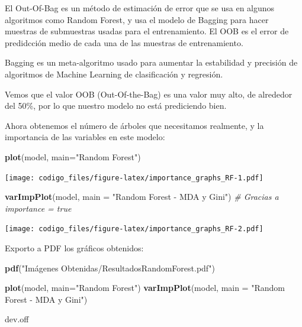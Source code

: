 \documentclass[]{article}
\newenvironment{Shaded}{\begin{snugshade}}{\end{snugshade}}
\newcommand{\KeywordTok}[1]{\textcolor[rgb]{0.13,0.29,0.53}{\textbf{#1}}}
\newcommand{\DataTypeTok}[1]{\textcolor[rgb]{0.13,0.29,0.53}{#1}}
\newcommand{\StringTok}[1]{\textcolor[rgb]{0.31,0.60,0.02}{#1}}
\newcommand{\CommentTok}[1]{\textcolor[rgb]{0.56,0.35,0.01}{\textit{#1}}}
\newcommand{\NormalTok}[1]{#1}
\begin{document}
El Out-Of-Bag es un método de estimación de error que se usa en algunos
algoritmos como Random Forest, y usa el modelo de Bagging para hacer
muestras de submuestras usadas para el entrenamiento. El OOB es el error
de predidcción medio de cada una de las muestras de entrenamiento.

Bagging es un meta-algoritmo usado para aumentar la estabilidad y
precisión de algoritmos de Machine Learning de clasificación y
regresión.

Vemos que el valor OOB (Out-Of-the-Bag) es una valor muy alto, de
alrededor del 50\%, por lo que nuestro modelo no está prediciendo bien.

Ahora obtenemos el número de árboles que necesitamos realmente, y la
importancia de las variables en este modelo:

\begin{Shaded}
\begin{Highlighting}[]
\KeywordTok{plot}\NormalTok{(model, }\DataTypeTok{main=}\StringTok{"Random Forest"}\NormalTok{)}
\end{Highlighting}
\end{Shaded}

\texttt{[image: codigo\_files/figure-latex/importance\_graphs\_RF-1.pdf]}

\begin{Shaded}
\begin{Highlighting}[]
\KeywordTok{varImpPlot}\NormalTok{(model, }\DataTypeTok{main =} \StringTok{"Random Forest - MDA y Gini"}\NormalTok{) }\CommentTok{# Gracias a importance = true}
\end{Highlighting}
\end{Shaded}

\texttt{[image: codigo\_files/figure-latex/importance\_graphs\_RF-2.pdf]}

Exporto a PDF los gráficos obtenidos:

\begin{Shaded}
\begin{Highlighting}[]
\KeywordTok{pdf}\NormalTok{(}\StringTok{"Imágenes Obtenidas/ResultadosRandomForest.pdf"}\NormalTok{)}

\KeywordTok{plot}\NormalTok{(model, }\DataTypeTok{main=}\StringTok{"Random Forest"}\NormalTok{)}
\KeywordTok{varImpPlot}\NormalTok{(model, }\DataTypeTok{main =} \StringTok{"Random Forest - MDA y Gini"}\NormalTok{)}

\NormalTok{dev.off}
\end{Highlighting}
\end{Shaded}
\end{document}
